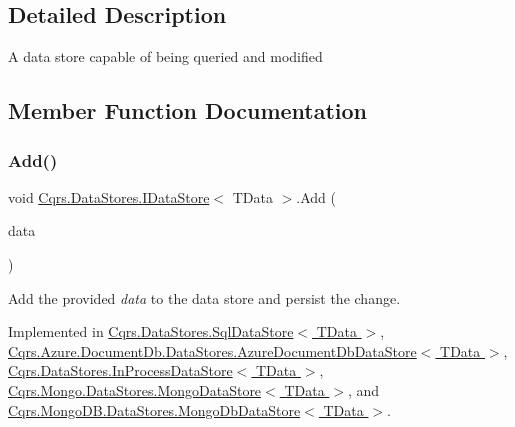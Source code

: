 \subsection{Detailed Description}
A data store capable of being queried and modified 



\subsection{Member Function Documentation}
\mbox{\label{interfaceCqrs_1_1DataStores_1_1IDataStore_a114404daaf37fec9cc5547cd9a17858c_a114404daaf37fec9cc5547cd9a17858c}} 
\subsubsection{\texorpdfstring{Add()}{Add()}\hspace{0.1cm}{\footnotesize\ttfamily [1/2]}}
{\footnotesize\ttfamily void \hyperlink{interfaceCqrs_1_1DataStores_1_1IDataStore}{Cqrs.\+Data\+Stores.\+I\+Data\+Store}$<$ T\+Data $>$.Add (\begin{DoxyParamCaption}\item[{T\+Data}]{data }\end{DoxyParamCaption})}



Add the provided {\itshape data}  to the data store and persist the change. 



Implemented in \hyperlink{classCqrs_1_1DataStores_1_1SqlDataStore_abcca53d2e93dbdfb193a9fb0996849c5_abcca53d2e93dbdfb193a9fb0996849c5}{Cqrs.\+Data\+Stores.\+Sql\+Data\+Store$<$ T\+Data $>$}, \hyperlink{classCqrs_1_1Azure_1_1DocumentDb_1_1DataStores_1_1AzureDocumentDbDataStore_ad17e6e846430e617af24be48b77d1528_ad17e6e846430e617af24be48b77d1528}{Cqrs.\+Azure.\+Document\+Db.\+Data\+Stores.\+Azure\+Document\+Db\+Data\+Store$<$ T\+Data $>$}, \hyperlink{classCqrs_1_1DataStores_1_1InProcessDataStore_ade5c4033c628598665c0cba986a54c15_ade5c4033c628598665c0cba986a54c15}{Cqrs.\+Data\+Stores.\+In\+Process\+Data\+Store$<$ T\+Data $>$}, \hyperlink{classCqrs_1_1Mongo_1_1DataStores_1_1MongoDataStore_a27bcfb40fe8203e09d320b2aa19fff3a_a27bcfb40fe8203e09d320b2aa19fff3a}{Cqrs.\+Mongo.\+Data\+Stores.\+Mongo\+Data\+Store$<$ T\+Data $>$}, and \hyperlink{classCqrs_1_1MongoDB_1_1DataStores_1_1MongoDbDataStore_affcb1268469b99963501dd8c58e4a480_affcb1268469b99963501dd8c58e4a480}{Cqrs.\+Mongo\+D\+B.\+Data\+Stores.\+Mongo\+Db\+Data\+Store$<$ T\+Data $>$}.

